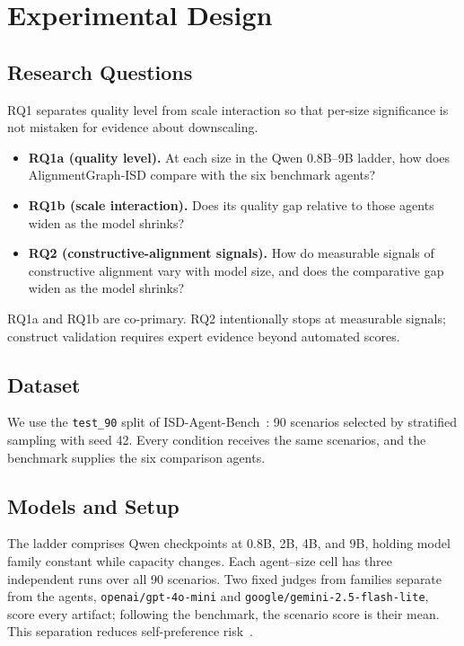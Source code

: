 \section{Experimental Design}
\label{sec:experimental-methodology}

\subsection{Research Questions}
\label{sec:rqs}

RQ1 separates quality level from scale interaction so that per-size significance is
not mistaken for evidence about downscaling.
\begin{itemize}
  \item \textbf{RQ1a (quality level).} At each size in the Qwen 0.8B--9B ladder,
  how does AlignmentGraph-ISD compare with the six benchmark agents?
  \item \textbf{RQ1b (scale interaction).} Does its quality gap relative to those
  agents widen as the model shrinks?
  \item \textbf{RQ2 (constructive-alignment signals).} How do measurable signals
  of constructive alignment vary with model size, and does the comparative gap
  widen as the model shrinks?
\end{itemize}
RQ1a and RQ1b are co-primary. RQ2 intentionally stops at measurable signals;
construct validation requires expert evidence beyond automated scores.

\subsection{Dataset}
\label{sec:dataset}

We use the \texttt{test\_90} split of ISD-Agent-Bench~\cite{isdagentbench}: 90
scenarios selected by stratified sampling with seed 42. Every condition receives
the same scenarios, and the benchmark supplies the six comparison agents.

\subsection{Models and Setup}
\label{sec:setup}

The ladder comprises Qwen checkpoints at 0.8B, 2B, 4B, and 9B, holding model family
constant while capacity changes. Each agent--size cell has three independent runs
over all 90 scenarios. Two fixed judges from families separate from the agents,
\texttt{openai/gpt-4o-mini} and \texttt{google/gemini-2.5-flash-lite}, score every
artifact; following the benchmark, the scenario score is their mean. This separation
reduces self-preference risk~\cite{panickssery2024llm}.

